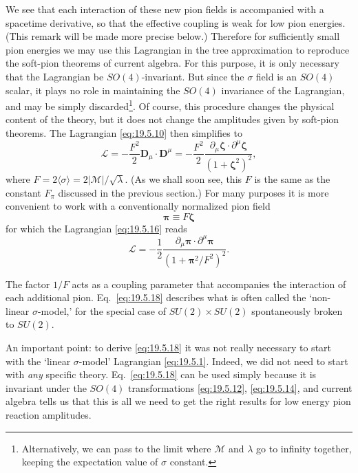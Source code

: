 We see that each interaction of these new pion fields is accompanied with a spacetime derivative, so that the effective coupling is weak for low pion energies. (This remark will be made more precise below.) Therefore for sufficiently small pion energies we may use this Lagrangian in the tree approximation to reproduce the soft-pion theorems of current algebra. For this purpose, it is only necessary that the Lagrangian be $SO(4)$-invariant. But since the $\sigma$ field is an $SO(4)$ scalar, it plays no role in maintaining the $SO(4)$ invariance of the Lagrangian, and may be simply discarded\footnote{Alternatively, we can pass to the limit where $\mathcal M$ and $\lambda$ go to infinity together, keeping the expectation value of $\sigma$ constant.}. Of course, this procedure changes the physical content of the theory, but it does not change the amplitudes given by soft-pion theorems. The Lagrangian \eqref{eq:19.5.10} then simplifies to
\begin{equation}
\mathcal L
=-\frac{F^2}{2}\boldsymbol D_\mu\cdot\boldsymbol D^\mu
=-\frac{F^2}{2}
\frac{\partial_\mu\boldsymbol{\zeta}\cdot
\partial^\mu\boldsymbol{\zeta}}
{(1+\boldsymbol{\zeta}^2)^2},
\tag{19.5.16}\label{eq:19.5.16}
\end{equation}
where $F=2\langle\sigma\rangle=2|\mathcal M|/\sqrt{\lambda}$. (As we shall soon see, this $F$ is the same as the constant $F_\pi$ discussed in the previous section.) For many purposes it is more convenient to work with a conventionally normalized pion field
\begin{equation}
\boldsymbol{\pi}\equiv F\boldsymbol{\zeta}
\tag{19.5.17}\label{eq:19.5.17}
\end{equation}
for which the Lagrangian \eqref{eq:19.5.16} reads
\begin{equation}
\mathcal L
=-\frac{1}{2}
\frac{\partial_\mu\boldsymbol{\pi}\cdot
\partial^\mu\boldsymbol{\pi}}
{(1+\boldsymbol{\pi}^2/F^2)^2}.
\tag{19.5.18}\label{eq:19.5.18}
\end{equation}

The factor $1/F$ acts as a coupling parameter that accompanies the interaction of each additional pion. Eq.~\eqref{eq:19.5.18} describes what is often called the `non-linear $\sigma$-model,' for the special case of $SU(2)\times SU(2)$ spontaneously broken to $SU(2)$.

An important point: to derive \eqref{eq:19.5.18} it was not really necessary to start with the `linear $\sigma$-model' Lagrangian \eqref{eq:19.5.1}. Indeed, we did not need to start with \emph{any} specific theory. Eq.~\eqref{eq:19.5.18} can be used simply because it is invariant under the $SO(4)$ transformations \eqref{eq:19.5.12}, \eqref{eq:19.5.14}, and current algebra tells us that this is all we need to get the right results for low energy pion reaction amplitudes.

